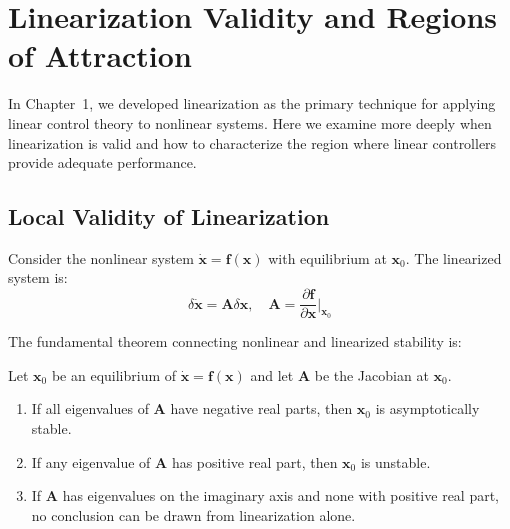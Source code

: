 
\section{Linearization Validity and Regions of Attraction}
\label{sec:linearization_validity}

In Chapter~1, we developed linearization as the primary technique for applying linear control theory to nonlinear systems. Here we examine more deeply when linearization is valid and how to characterize the region where linear controllers provide adequate performance.

\subsection{Local Validity of Linearization}

Consider the nonlinear system $\dot{\mathbf{x}} = \mathbf{f}(\mathbf{x})$ with equilibrium at $\mathbf{x}_0$. The linearized system is:
\begin{equation}
\delta\dot{\mathbf{x}} = \mathbf{A}\delta\mathbf{x}, \quad \mathbf{A} = \frac{\partial \mathbf{f}}{\partial \mathbf{x}}\bigg|_{\mathbf{x}_0}
\end{equation}

The fundamental theorem connecting nonlinear and linearized stability is:

\begin{theorem}
\label{thm:lyapunov_indirect}
Let $\mathbf{x}_0$ be an equilibrium of $\dot{\mathbf{x}} = \mathbf{f}(\mathbf{x})$ and let $\mathbf{A}$ be the Jacobian at $\mathbf{x}_0$.
\begin{enumerate}
    \item If all eigenvalues of $\mathbf{A}$ have negative real parts, then $\mathbf{x}_0$ is asymptotically stable.
    \item If any eigenvalue of $\mathbf{A}$ has positive real part, then $\mathbf{x}_0$ is unstable.
    \item If $\mathbf{A}$ has eigenvalues on the imaginary axis and none with positive real part, no conclusion can be drawn from linearization alone.
\end{enumerate}
\end{theorem}

